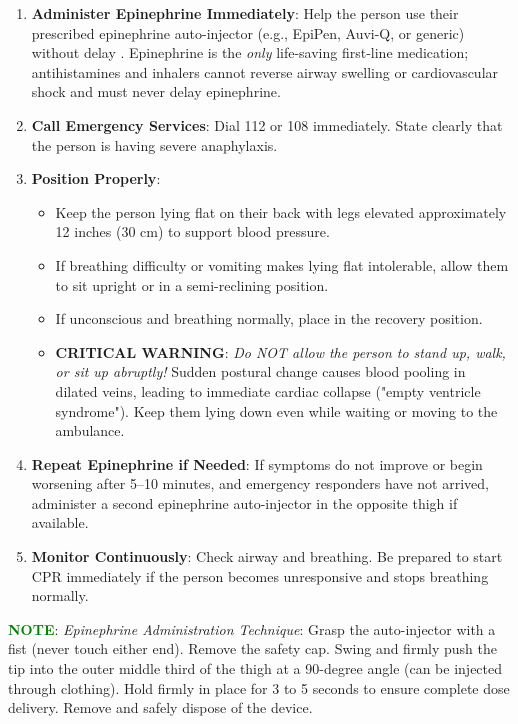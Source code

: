 \begin{enumerate}[leftmargin=*]
\item \textbf{Administer Epinephrine Immediately}: Help the person use their prescribed epinephrine auto-injector (e.g., EpiPen, Auvi-Q, or generic) without delay \cite{aha_arc_2024,wao_anaphylaxis_2020}. Epinephrine is the \emph{only} life-saving first-line medication; antihistamines and inhalers cannot reverse airway swelling or cardiovascular shock and must never delay epinephrine.
\item \textbf{Call Emergency Services}: Dial 112 or 108 immediately. State clearly that the person is having severe anaphylaxis.
\item \textbf{Position Properly}:
  \begin{itemize}
    \item Keep the person lying flat on their back with legs elevated approximately 12 inches (30 cm) to support blood pressure.
    \item If breathing difficulty or vomiting makes lying flat intolerable, allow them to sit upright or in a semi-reclining position.
    \item If unconscious and breathing normally, place in the recovery position.
    \item \textbf{CRITICAL WARNING}: \emph{Do NOT allow the person to stand up, walk, or sit up abruptly!} Sudden postural change causes blood pooling in dilated veins, leading to immediate cardiac collapse ("empty ventricle syndrome"). Keep them lying down even while waiting or moving to the ambulance.
  \end{itemize}
\item \textbf{Repeat Epinephrine if Needed}: If symptoms do not improve or begin worsening after 5--10 minutes, and emergency responders have not arrived, administer a second epinephrine auto-injector in the opposite thigh if available.
\item \textbf{Monitor Continuously}: Check airway and breathing. Be prepared to start CPR immediately if the person becomes unresponsive and stops breathing normally.
\end{enumerate}
\noindent\textbf{\textcolor{green}{NOTE}}: \textit{Epinephrine Administration Technique}: Grasp the auto-injector with a fist (never touch either end). Remove the safety cap. Swing and firmly push the tip into the outer middle third of the thigh at a 90-degree angle (can be injected through clothing). Hold firmly in place for 3 to 5 seconds to ensure complete dose delivery. Remove and safely dispose of the device.

